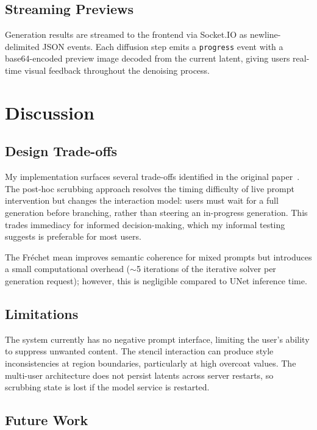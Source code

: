 \documentclass[sigconf]{acmart}
\begin{document}
\subsection{Streaming Previews}

Generation results are streamed to the frontend via Socket.IO as
newline-delimited JSON events. Each diffusion step emits a \texttt{progress}
event with a base64-encoded preview image decoded from the current latent,
giving users real-time visual feedback throughout the denoising process.

\section{Discussion}

\subsection{Design Trade-offs}

My implementation surfaces several trade-offs identified in the
original paper~\cite{chung2023promptpaint}. The post-hoc scrubbing approach
resolves the timing difficulty of live prompt intervention but changes the
interaction model: users must wait for a full generation before branching,
rather than steering an in-progress generation. This trades immediacy for
informed decision-making, which my informal testing suggests is preferable
for most users.

The Fréchet mean improves semantic coherence for mixed prompts but introduces
a small computational overhead ($\sim$5 iterations of the iterative solver
per generation request); however, this is negligible compared to UNet inference time.

\subsection{Limitations}

The system currently has no negative prompt interface, limiting the user's
ability to suppress unwanted content. The stencil interaction can produce
style inconsistencies at region boundaries, particularly at high overcoat
values. The multi-user architecture does not persist latents across server
restarts, so scrubbing state is lost if the model service is restarted.

\subsection{Future Work}
\end{document}
